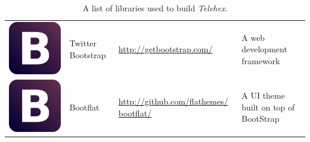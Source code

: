 \documentclass[12pt, a4paper]{article}
\begin{document}
\begin{table}[H]
{\begin{tabular}{|m{0.3cm}m{2.4cm}m{5.6cm}m{8.8cm}|}
\includegraphics[scale=0.02]{boot.png}& Twitter Bootstrap & \href{http://getbootstrap.com/}{http://getbootstrap.com/} & A web development framework \\
\includegraphics[scale=0.02]{boot.png}& Bootflat & \href{http://github.com/flathemes/bootflat/}{http://github.com/flathemes/ bootflat/} & A UI theme built on top of BootStrap \\
\hline
\end{tabular}}
\caption{A list of libraries used to build \textit{Telehex}.}
\label{tab:libs} 
\end{table}
\end{document}
